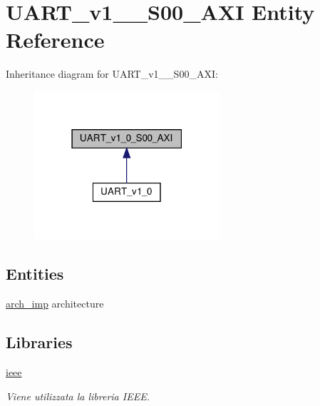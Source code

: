 \hypertarget{classUART__v1__0__S00__AXI}{}\section{U\+A\+R\+T\+\_\+v1\+\_\+\_\+\+S00\+\_\+\+A\+XI Entity Reference}
\label{classUART__v1__0__S00__AXI}


Inheritance diagram for U\+A\+R\+T\+\_\+v1\+\_\+\_\+\+S00\+\_\+\+A\+XI\+:\nopagebreak
\begin{figure}[H]
\begin{center}
\leavevmode
\includegraphics[width=195pt]{classUART__v1__0__S00__AXI__inherit__graph}
\end{center}
\end{figure}
\subsection*{Entities}
\begin{DoxyCompactItemize}
\item 
\hyperlink{classUART__v1__0__S00__AXI_1_1arch__imp}{arch\+\_\+imp} architecture
\end{DoxyCompactItemize}
\subsection*{Libraries}
 \begin{DoxyCompactItemize}
\item 
\mbox{\label{classUART__v1__0__S00__AXI_a0a6af6eef40212dbaf130d57ce711256}} 
\hyperlink{classUART__v1__0__S00__AXI_a0a6af6eef40212dbaf130d57ce711256}{ieee} 
\begin{DoxyCompactList}\small\item\em Viene utilizzata la libreria I\+E\+EE. \end{DoxyCompactList}\end{DoxyCompactItemize}
